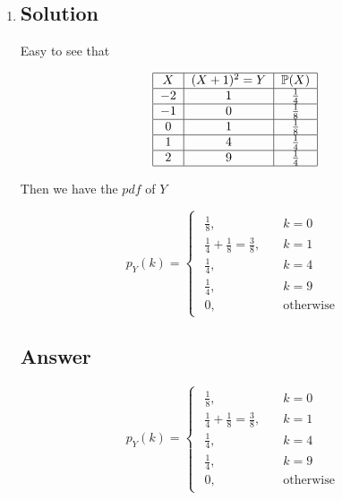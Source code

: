 \documentclass[12pt]{article}
\newcommand{\bP}{\mathbb{P}}
\begin{document}
	\begin{enumerate}[label={},leftmargin=0in]\item
		\subsection*{Solution}
		
			Easy to see that
			
			\[
				\begin{tabular}{|c|c|c|}
					\hline
					$X$  & $(X+1)^2=Y$ & $\bP(X)$       \\ \hline
					$-2$ & $1$         & $\frac{1}{4}$  \\ \hline
					$-1$ & $0$         & $\frac{1}{8}$  \\ \hline
					$0$  & $1$         & $\frac{1}{8}$  \\ \hline
					$1$  & $4$         & $\frac{1}{4}$  \\ \hline
					$2$  & $9$         & $\frac{1}{4}$  \\ \hline
				\end{tabular}
			\]
			
			Then we have the $pdf$ of $Y$
			
			\[
				p_Y(k) =
				\begin{cases}
					\begin{aligned}
						\frac{1}{8}, &\quad k = 0\\
						\frac{1}{4} + \frac{1}{8} = \frac{3}{8}, &\quad k = 1\\
						\frac{1}{4}, &\quad k = 4\\
						\frac{1}{4}, &\quad k = 9\\
						0, &\quad \text{otherwise}
					\end{aligned}
				\end{cases}
			\]
		
		\subsection*{Answer}
		
			\[\boxed{p_Y(k) =
				\begin{cases}
					\begin{aligned}
						\frac{1}{8}, &\quad k = 0\\
						\frac{1}{4} + \frac{1}{8} = \frac{3}{8}, &\quad k = 1\\
						\frac{1}{4}, &\quad k = 4\\
						\frac{1}{4}, &\quad k = 9\\
						0, &\quad \text{otherwise}
					\end{aligned}
			\end{cases}}\]
	\end{enumerate}
	
\end{document}
